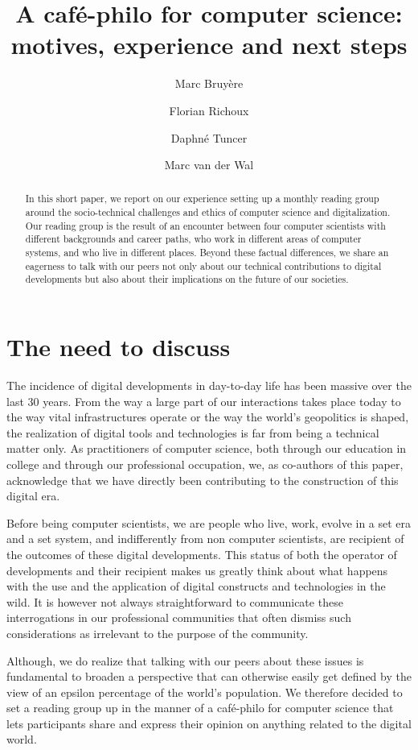 \documentclass[journal]{IEEEtran}
\title{A café-philo for computer science:\\motives, experience and next steps}
\date{}
\author[1,3]{Marc Bruyère}
\author[2,3]{Florian Richoux}
\author[4]{Daphné Tuncer}
\author[5]{Marc van der Wal}
\affil[   ]{\it   marc@iij.ad.jp    \quad   florian@richoux.fr   \quad
  daphne.tuncer@enpc.fr \quad marc.vanderwal@afnic.fr}
\affil[1]{IIJ Research Lab, Japan}
\affil[2]{AIST, Japan}
\affil[3]{JFLI, CNRS, Japan}
\affil[4]{École des Ponts ParisTech, France}
\affil[5]{Afnic, France}
\begin{document}
\maketitle

\begin{abstract}
  In  this short  paper,  we report  on our  experience  setting up  a
  monthly  reading group  around  the  socio-technical challenges  and
  ethics of computer science and  digitalization. Our reading group is
  the result  of an  encounter between  four computer  scientists with
  different backgrounds and career paths,  who work in different areas
  of computer systems, and who  live in different places. Beyond these
  factual differences,  we share an  eagerness to talk with  our peers
  not only  about our technical contributions  to digital developments
  but also about their implications on the future of our societies.
\end{abstract}

\section{The need to discuss}

The  incidence of  digital developments  in day-to-day  life has  been
massive over  the last  30 years.  From the  way a  large part  of our
interactions  takes  place  today  to the  way  vital  infrastructures
operate or the way the  world’s geopolitics is shaped, the realization
of digital tools and technologies is far from being a technical matter
only. As practitioners of computer science, both through our education
in college and through our  professional occupation, we, as co-authors
of this paper, acknowledge that  we have directly been contributing to
the construction of this digital era.

Before being computer scientists, we are people who live, work, evolve
in a  set era and  a set system,  and indifferently from  non computer
scientists,   are  recipient   of  the   outcomes  of   these  digital
developments. This  status of  both the  operator of  developments and
their recipient makes us greatly think about what happens with the use
and  the application  of digital  constructs and  technologies in  the
wild. It  is however not  always straightforward to  communicate these
interrogations in our professional communities that often dismiss such
considerations as irrelevant to the purpose of the community.

Although, we do realize that talking with our peers about these issues
is fundamental to broaden a  perspective that can otherwise easily get
defined  by  the  view  of   an  epsilon  percentage  of  the  world’s
population. We  therefore decided  to set  a reading  group up  in the
manner of  a café-philo  for computer  science that  lets participants
share and  express their  opinion on anything  related to  the digital
world.
\end{document}
